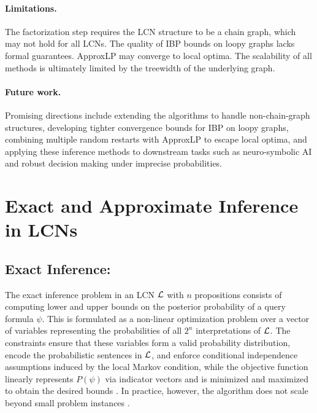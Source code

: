 \documentclass{article}
\begin{document}
\paragraph{Limitations.} The factorization step requires the LCN structure to be a chain graph, which may not hold for all LCNs. The quality of IBP bounds on loopy graphs lacks formal guarantees. ApproxLP may converge to local optima. The scalability of all methods is ultimately limited by the treewidth of the underlying graph.

\paragraph{Future work.} Promising directions include extending the algorithms to handle non-chain-graph structures, developing tighter convergence bounds for IBP on loopy graphs, combining multiple random restarts with ApproxLP to escape local optima, and applying these inference methods to downstream tasks such as neuro-symbolic AI and robust decision making under imprecise probabilities.








\appendix

\section{Exact and Approximate Inference in LCNs}

\subsection{Exact Inference:} 
The exact inference problem in an LCN $\mathcal{L}$ with $n$ propositions consists of computing lower and upper bounds on the posterior probability of a query formula $\psi$. This is formulated as a non-linear optimization problem over a vector of variables representing the probabilities of all $2^n$ interpretations of $\mathcal{L}$. The constraints ensure that these variables form a valid probability distribution, encode the probabilistic sentences in $\mathcal{L}$, and enforce conditional independence assumptions induced by the local Markov condition, while the objective function linearly represents $P(\psi)$ via indicator vectors and is minimized and maximized to obtain the desired bounds \cite{marinescu2022neurips}. In practice, however, the algorithm does not scale beyond small problem instances \cite{marinescu2022neurips}.
\end{document}

